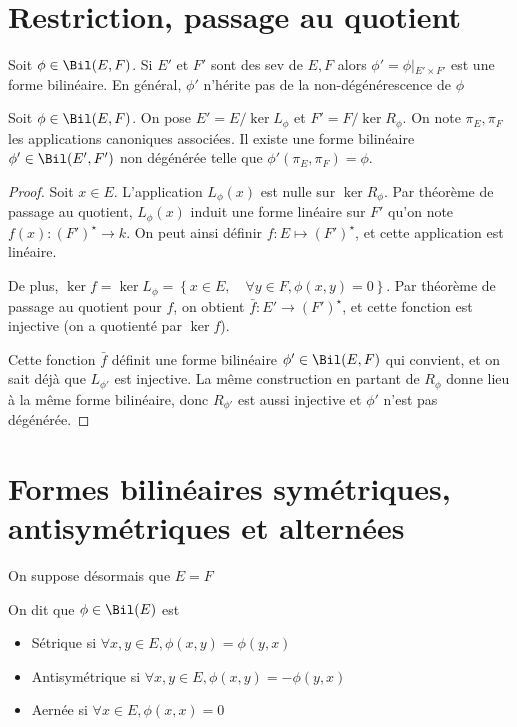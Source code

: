 
\section{Restriction, passage au quotient}

\begin{prop}
    Soit $\phi\in \Bil (E, F)$. Si  $E'$ et  $F'$ sont des sev de  $E, F$ alors  $\phi'=\phi\left|_{E'\times F'}\right.$ est une forme bilinéaire. En général,  $\phi'$ n'hérite pas de la non-dégénérescence de  $\phi$
\end{prop}


\begin{prop}
    Soit $\phi \in  \Bil(E, F)$. On pose $E'=E / \ker L_\phi$ et  $F'=F / \ker R_\phi$. On note  $\pi_E, \pi_F$ les applications canoniques associées. Il existe une forme bilinéaire $\phi' \in  \Bil(E', F')$ non dégénérée telle que $\phi'(\pi_E, \pi_F)=\phi$.
\end{prop}

\begin{proof}
    Soit $x \in  E$. L'application $L_\phi(x)$ est nulle sur  $\ker R_\phi$. Par théorème de passage au quotient,  $L_\phi(x)$ induit une forme linéaire sur  $F'$ qu'on note  $f(x):(F')^\star \longrightarrow k$. On peut ainsi définir $f:E \longmapsto (F')^\star$, et cette application est linéaire.

    De plus, $\ker f=\ker L_\phi= \left\{ x \in E, \quad  \forall  y \in  F, \phi(x, y)=0 \right\} $. Par théorème de passage au quotient pour $f$, on obtient  $\bar{f} : E' \longrightarrow (F')^\star$, et cette fonction est injective (on a quotienté par $\ker f$).

    Cette fonction $\bar{f}$ définit une forme bilinéaire $\phi' \in  \Bil(E, F)$ qui convient, et on sait déjà que $L_{\phi'}$ est injective. La même construction en partant de  $R_\phi$ donne lieu à la même forme bilinéaire, donc  $R_{\phi'}$ est aussi injective et  $\phi'$ n'est pas dégénérée.
\end{proof}

\section{Formes bilinéaires symétriques, antisymétriques et alternées}

On suppose désormais que $E=F$

 \begin{dfn}
     On dit que $\phi \in  \Bil(E)$ est \begin{itemize}
         \item Sétrique si $\forall  x, y \in  E, \phi(x, y)=\phi(y, x)$ 
         \item Antisymétrique si $\forall  x, y \in  E, \phi(x, y)=-\phi(y, x)$ 
         \item Aernée si $\forall  x \in  E, \phi(x, x)=0$
     \end{itemize}
\end{dfn}

